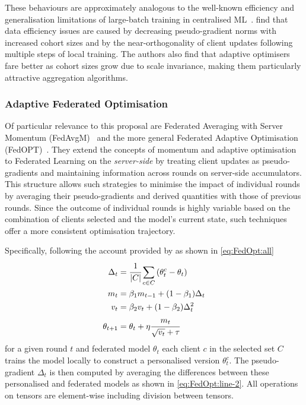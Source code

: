 These behaviours are approximately analogous to the well-known efficiency and generalisation limitations of large-batch training in centralised ML~\citep{LargeBatchGenGapSharpMinima}. \citet{LargeCohorts} find that data efficiency issues are caused by decreasing pseudo-gradient norms with increased cohort sizes and by the near-orthogonality of client updates following multiple steps of local training. The authors also find that adaptive optimisers fare better as cohort sizes grow due to scale invariance, making them particularly attractive aggregation algorithms.

\subsubsection{Adaptive Federated Optimisation}

Of particular relevance to this proposal are Federated Averaging with Server Momentum (FedAvgM)~\citep{FedAvgM} and the more general Federated Adaptive Optimisation (FedOPT)~\citep{FedOPT}. They extend the concepts of momentum and adaptive optimisation~\citep{AdaGrad,Adam,SgdAlgoOverview} to Federated Learning on the \textit{server-side} by treating client updates as pseudo-gradients and maintaining information across rounds on server-side accumulators. This structure allows such strategies to minimise the impact of individual rounds by averaging their pseudo-gradients and derived quantities with those of previous rounds. Since the outcome of individual rounds is highly variable based on the combination of clients selected and the model's current state, such techniques offer a more consistent optimisation trajectory.

Specifically, following the account provided by \citet{FedOPT} as shown in \cref{eq:FedOpt:all}
\begin{subequations}
    \begin{align}
        \Delta_t     & = \cfrac{1}{|C|} \sum_{c \in C} \left( \theta_t^c - \theta_t \right) \label{eq:FedOpt:line-2} \\
        m_t          & = \beta_1 m_{t-1} + (1-\beta_1) \Delta_t \label{eq:FedOpt:line-3}                             \\
        v_t          & = \beta_2 v_t + (1-\beta_2) \Delta_t^2 \label{eq:FedOpt:line-4}                               \\
        \theta_{t+1} & = \theta_t + \eta \cfrac{m_t}{\sqrt{v_t} + \tau} \label{eq:FedOpt:line-5}
    \end{align}
    \label{eq:FedOpt:all}
\end{subequations}
for a given round $t$ and federated model $\theta_t$  each client $c$ in the selected set $C$ trains the model locally to construct a personalised version $\theta_t^c$. The pseudo-gradient $\Delta_t$ is then computed by averaging the differences between these personalised and federated models as shown in \cref{eq:FedOpt:line-2}. All operations on tensors are element-wise including division between tensors.

